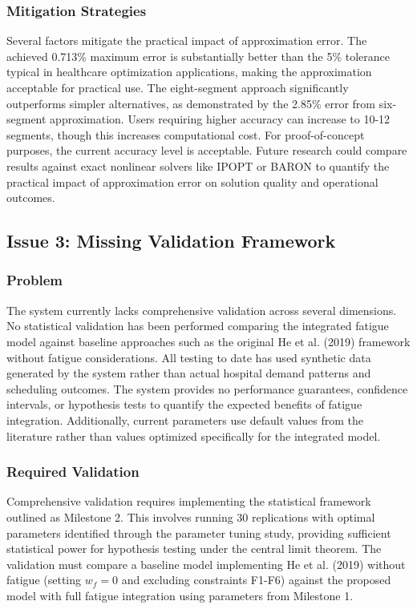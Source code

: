 \documentclass[11pt,letterpaper]{article}
\begin{document}
\subsubsection{Mitigation Strategies}
Several factors mitigate the practical impact of approximation error. The achieved 0.713\% maximum error is substantially better than the 5\% tolerance typical in healthcare optimization applications, making the approximation acceptable for practical use. The eight-segment approach significantly outperforms simpler alternatives, as demonstrated by the 2.85\% error from six-segment approximation. Users requiring higher accuracy can increase to 10-12 segments, though this increases computational cost. For proof-of-concept purposes, the current accuracy level is acceptable. Future research could compare results against exact nonlinear solvers like IPOPT or BARON to quantify the practical impact of approximation error on solution quality and operational outcomes.

\subsection{Issue 3: Missing Validation Framework}

\subsubsection{Problem}
The system currently lacks comprehensive validation across several dimensions. No statistical validation has been performed comparing the integrated fatigue model against baseline approaches such as the original He et al. (2019) framework without fatigue considerations. All testing to date has used synthetic data generated by the system rather than actual hospital demand patterns and scheduling outcomes. The system provides no performance guarantees, confidence intervals, or hypothesis tests to quantify the expected benefits of fatigue integration. Additionally, current parameters use default values from the literature rather than values optimized specifically for the integrated model.

\subsubsection{Required Validation}
Comprehensive validation requires implementing the statistical framework outlined as Milestone 2. This involves running 30 replications with optimal parameters identified through the parameter tuning study, providing sufficient statistical power for hypothesis testing under the central limit theorem. The validation must compare a baseline model implementing He et al. (2019) without fatigue (setting $w_f = 0$ and excluding constraints F1-F6) against the proposed model with full fatigue integration using parameters from Milestone 1.
\end{document}
